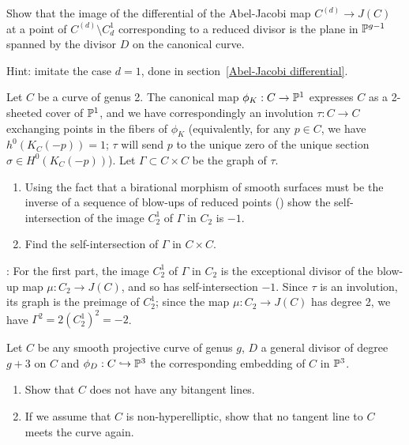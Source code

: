 \begin{exercise} \label{comparison with geometric RR}
Show that the image of the differential of the Abel-Jacobi map $C^{(d)} \to J(C)$ at a point of $C^{(d)} \setminus C^1_d$  corresponding to a reduced divisor is  the plane in $\PP^{g-1}$ spanned by the divisor $D$ on the canonical curve.

Hint: imitate the case $d=1$, done in section~\ref{Abel-Jacobi differential}.
\end{exercise}

\begin{exercise}\label{blow-up of $J(C)$ at a point}
Let $C$ be a curve of genus 2. The canonical map $\phi_K : C \to \PP^1$ expresses $C$ as a 2-sheeted cover of $\PP^1$, and we have correspondingly an involution $\tau : C \to C$ exchanging points in the fibers of $\phi_K$ (equivalently, for any $p \in C$, we have $h^0(K_C(-p)) = 1$; $\tau$ will send $p$ to the unique zero of the unique section $\sigma \in H^0(K_C(-p))$). Let $\Gamma \subset C \times C$ be the graph of $\tau$.
\begin{enumerate}
\item Using the fact that a birational morphism of smooth surfaces must be the inverse of a sequence of blow-ups of reduced points (\cite[V.??]{H}) show the self-intersection of the image $C^1_2$ of $\Gamma$ in $C_2$ is $-1$.
\item Find the self-intersection of $\Gamma$ in $C \times C$.
\end{enumerate}

: For the first part, the image $C^1_2$  of $\Gamma$ in $C_2$ is the exceptional divisor of the blow-up map $\mu : C_2 \to J(C)$, and so has self-intersection $-1$. Since $\tau$ is an involution, its graph is the preimage of $C^1_2$; since the map $\mu : C_2 \to J(C)$ has degree 2, we have $\Gamma^2 = 2(C^1_2)^2 = -2$.
\end{exercise}

\begin{exercise}
Let $C$ be any smooth projective curve of genus $g$, $D$ a general divisor of degree $g+3$ on $C$ and $\phi_D : C \hookrightarrow \PP^3$ the corresponding embedding of $C$ in $\PP^3$.
\begin{enumerate}
\item Show that $C$ does not have any bitangent lines.
\item If we assume that $C$ is non-hyperelliptic, show that no tangent line to $C$ meets the curve again.
\end{enumerate}
\end{exercise}

